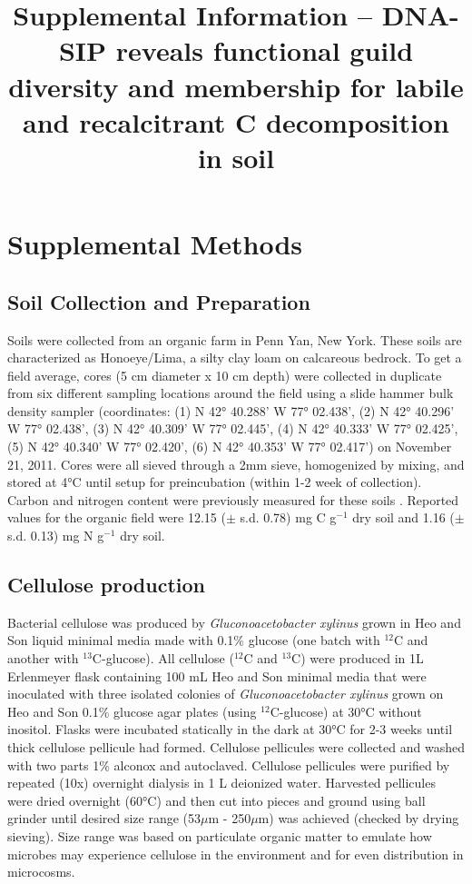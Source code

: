 \documentclass{article}
\title{Supplemental Information -- DNA-SIP reveals functional guild
diversity and membership for labile and recalcitrant C decomposition in
soil}
\begin{document}
\maketitle

\tableofcontents

\listoffigures

\section{Supplemental Methods}\label{SI} 

\subsection{Soil Collection and Preparation} 
Soils were collected from an organic farm in Penn Yan, New York. These soils
are characterized as Honoeye/Lima, a silty clay loam on calcareous bedrock. To
get a field average, cores (5 cm diameter x 10 cm depth) were collected in
duplicate from six different sampling locations around the field using a slide
hammer bulk density sampler (coordinates: (1) N 42°
40.288’ W 77° 02.438’, (2) N 42° 40.296’ W 77° 02.438’, (3) N 42° 40.309’ W 77°
02.445’, (4) N 42° 40.333’ W 77° 02.425’, (5) N 42° 40.340’ W 77° 02.420’,
(6) N 42° 40.353’ W 77° 02.417’) on November 21, 2011. Cores were all sieved
through a 2mm sieve, homogenized by mixing, and stored at 4°C until setup
for preincubation (within 1-2 week of collection).  Carbon and nitrogen
content were previously measured for these soils \citep{Berthrong_2013}.
Reported values for the organic field were 12.15 ($\pm$ s.d. 0.78) mg
C g$^{-1}$ dry soil and 1.16 ($\pm$ s.d. 0.13) mg
N g$^{-1}$ dry soil. 

\subsection{Cellulose production}
Bacterial cellulose was produced by \textit{Gluconoacetobacter xylinus} grown
in Heo and Son \citep{Heo_2002} liquid minimal media made with 0.1\% glucose
(one batch with $^{12}$C and another with $^{13}$C-glucose). All cellulose
($^{12}$C and $^{13}$C) were produced in 1L Erlenmeyer flask containing 100 mL
Heo and Son minimal media that were inoculated with three isolated colonies of
\textit{Gluconoacetobacter xylinus} grown on Heo and Son 0.1\% glucose agar
plates (using $^{12}$C-glucose) at 30°C without inositol. Flasks were incubated
statically in the dark at 30°C for 2-3 weeks until thick cellulose pellicule
had formed.  Cellulose pellicules were collected and washed with two parts 1\%
alconox and autoclaved. Cellulose pellicules were purified by repeated (10x)
overnight dialysis in 1 L deionized water. Harvested pellicules were dried
overnight (60°C) and then cut into pieces and ground using ball grinder until
desired size range (53$\mu$m - 250$\mu$m) was achieved (checked by drying
sieving). Size range was based on particulate organic matter to emulate how
microbes may experience cellulose in the environment \citep{Cambardella_1992}
and for even distribution in microcosms. 
\end{document}
